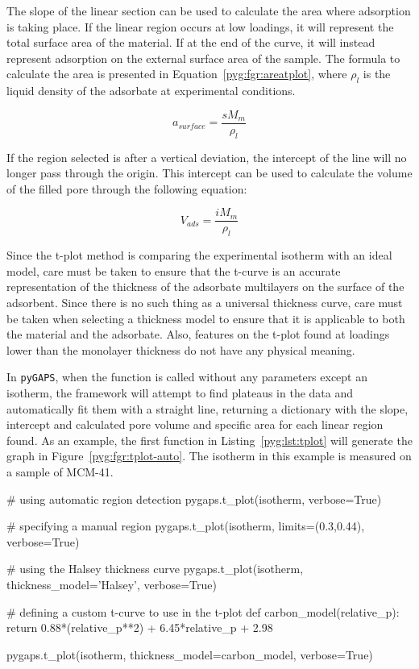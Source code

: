 The slope of the linear section can be used to calculate the area where
adsorption is taking place. If the linear region occurs at low loadings,
it will represent the total surface area of the material.
If at the end of the curve, it will instead represent adsorption on
the external surface area of the sample. The formula to calculate the area
is presented in Equation~\ref{pyg:fgr:areatplot},
where \(\rho_{l}\) is the liquid density of the adsorbate at experimental
conditions.

\begin{equation}\label{pyg:fgr:areatplot}
	a_{surface} = \frac{s M_m}{\rho_{l}}
\end{equation}

If the region selected is after a vertical deviation, the intercept of 
the line will no longer pass through the origin. This intercept can 
be used to calculate the volume of the filled pore through the 
following equation:

\begin{equation}
	V_{ads} = \frac{i M_m}{\rho_{l}}
\end{equation}

Since the t-plot method is comparing the experimental isotherm 
with an ideal model, care must be taken to ensure that the t-curve
is an accurate representation of the thickness of the 
adsorbate multilayers on the surface of the adsorbent. 
Since there is no such thing as a universal thickness curve,
care must be taken when selecting a thickness model to ensure that it
is applicable to both the material and the adsorbate.
Also, features on the t-plot found at loadings lower than the monolayer
thickness do not have any physical meaning.

In \texttt{pyGAPS}, when the function is called without any parameters
except an isotherm, the framework will attempt to find 
plateaus in the data and
automatically fit them with a straight line, returning a dictionary
with the slope, intercept and calculated pore volume and specific area
for each linear region found. As an example, the first function in
Listing~\ref{pyg:lst:tplot} will generate the graph in
Figure~\ref{pyg:fgr:tplot-auto}. The isotherm in this example is measured
on a sample of MCM-41.

\begin{python}[float=htb, caption={Generating a t-plot},%
    label={pyg:lst:tplot}]
# using automatic region detection
pygaps.t_plot(isotherm, verbose=True)

# specifying a manual region
pygaps.t_plot(isotherm, limits=(0.3,0.44), verbose=True)

# using the Halsey thickness curve
pygaps.t_plot(isotherm, thickness_model='Halsey', verbose=True)

# defining a custom t-curve to use in the t-plot
def carbon_model(relative_p):
	return 0.88*(relative_p**2) + 6.45*relative_p + 2.98

pygaps.t_plot(isotherm, thickness_model=carbon_model, verbose=True)
\end{python}

